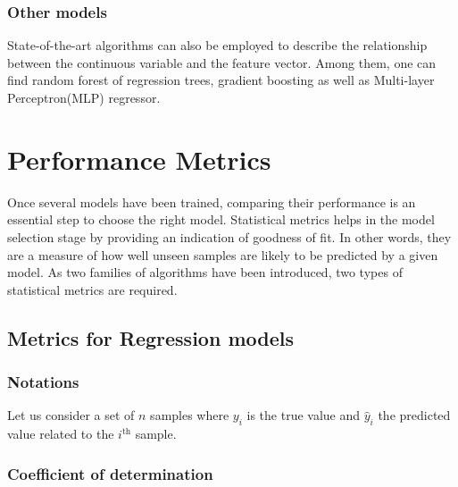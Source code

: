 \documentclass[
]{book}
\begin{document}
\hypertarget{other-models-1}{%
\subsubsection*{Other models}\label{other-models-1}}

State-of-the-art algorithms can also be employed to describe the relationship between the continuous variable and the feature vector. Among them, one can find random forest of regression trees, gradient boosting as well as Multi-layer Perceptron(MLP) regressor.

\hypertarget{performance-metrics}{%
\section{Performance Metrics}\label{performance-metrics}}

Once several models have been trained, comparing their performance is an essential step to choose the right model. Statistical metrics helps in the model selection stage by providing an indication of goodness of fit. In other words, they are a measure of how well unseen samples are likely to be predicted by a given model. As two families of algorithms have been introduced, two types of statistical metrics are required.

\hypertarget{metrics-for-regression-models}{%
\subsection{Metrics for Regression models}\label{metrics-for-regression-models}}

\hypertarget{notations-1}{%
\subsubsection*{Notations}\label{notations-1}}

Let us consider a set of \(n\) samples where \(y_i\) is the true value and \(\hat{y}_i\) the predicted value related to the \(i^\text{th}\) sample.

\hypertarget{coefficient-of-determination}{%
\subsubsection*{Coefficient of determination}\label{coefficient-of-determination}}
\end{document}
